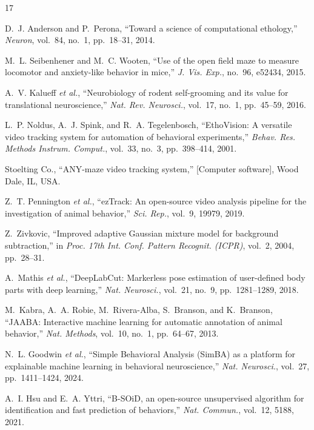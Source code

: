 \begin{thebibliography}{17}

D.~J. Anderson and P.~Perona, ``Toward a science of computational ethology,'' \emph{Neuron}, vol.~84, no.~1, pp.~18--31, 2014.

M.~L. Seibenhener and M.~C. Wooten, ``Use of the open field maze to measure locomotor and anxiety-like behavior in mice,'' \emph{J. Vis. Exp.}, no.~96, e52434, 2015.

A.~V. Kalueff \emph{et al.}, ``Neurobiology of rodent self-grooming and its value for translational neuroscience,'' \emph{Nat. Rev. Neurosci.}, vol.~17, no.~1, pp.~45--59, 2016.

L.~P. Noldus, A.~J. Spink, and R.~A. Tegelenbosch, ``EthoVision: A versatile video tracking system for automation of behavioral experiments,'' \emph{Behav. Res. Methods Instrum. Comput.}, vol.~33, no.~3, pp.~398--414, 2001.

Stoelting Co., ``ANY-maze video tracking system,'' [Computer software], Wood Dale, IL, USA.

Z.~T. Pennington \emph{et al.}, ``ezTrack: An open-source video analysis pipeline for the investigation of animal behavior,'' \emph{Sci. Rep.}, vol.~9, 19979, 2019.

Z.~Zivkovic, ``Improved adaptive Gaussian mixture model for background subtraction,'' in \emph{Proc. 17th Int. Conf. Pattern Recognit. (ICPR)}, vol.~2, 2004, pp.~28--31.

A.~Mathis \emph{et al.}, ``DeepLabCut: Markerless pose estimation of user-defined body parts with deep learning,'' \emph{Nat. Neurosci.}, vol.~21, no.~9, pp.~1281--1289, 2018.

M.~Kabra, A.~A. Robie, M.~Rivera-Alba, S.~Branson, and K.~Branson, ``JAABA: Interactive machine learning for automatic annotation of animal behavior,'' \emph{Nat. Methods}, vol.~10, no.~1, pp.~64--67, 2013.

N.~L. Goodwin \emph{et al.}, ``Simple Behavioral Analysis (SimBA) as a platform for explainable machine learning in behavioral neuroscience,'' \emph{Nat. Neurosci.}, vol.~27, pp.~1411--1424, 2024.

A.~I. Hsu and E.~A. Yttri, ``B-SOiD, an open-source unsupervised algorithm for identification and fast prediction of behaviors,'' \emph{Nat. Commun.}, vol.~12, 5188, 2021.


\end{thebibliography}
